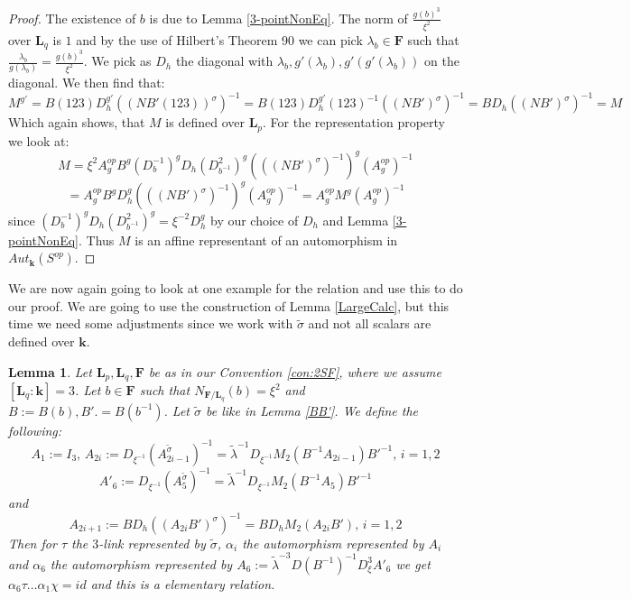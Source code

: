 \documentclass[12pt, oneside, reqno]{amsart}
\newtheorem{lemma}[theorem]{Lemma}
\begin{document}
\begin{proof}
    The existence of $b$ is due to Lemma \ref{3-pointNonEq}. The norm of $\frac{g(b)^3}{\xi^2}$ over $\textbf{L}_q$ is $1$ and by the use of Hilbert's Theorem 90 we can pick $\lambda_b \in \textbf{F}$ such that $\frac{\lambda_b}{g(\lambda_b)} = \frac{g(b)^3}{\xi^2}$. We pick as $D_h$ the diagonal with $\lambda_b, g'(\lambda_b),g'(g'(\lambda_b))$ on the diagonal. We then find that:
    \[M^{g'} = B (123) D_h^{g'} ((N B' (123))^{\sigma})^{-1} = B (123) D_h^{g'} (123)^{-1} ((NB')^{\sigma})^{-1} = B D_h ((NB')^{\sigma})^{-1} = M\]
    Which again shows, that $M$ is defined over $\textbf{L}_p$. For the representation property we look at:
    \[M = \xi^2 A_g^{op} B^g (D_b^{-1})^g D_h (D_{b^{-1}}^2)^g (((NB')^{\sigma})^{-1})^g (A_g^{op})^{-1} \] \[= A_g^{op} B^g D_h^g (((NB')^{\sigma})^{-1})^g (A_g^{op})^{-1} = A_g^{op} M^g (A_g^{op})^{-1}\]
    since $(D_b^{-1})^g D_h (D_{b^{-1}}^2)^g = \xi^{-2}D_h^g$ by our choice of $D_h$ and Lemma \ref{3-pointNonEq}. Thus $M$ is an affine representant of an automorphism in $Aut_{\textbf{k}}(S^{op})$.
\end{proof}
\noindent We are now again going to look at one example for the relation and use this to do our proof. We are going to use the construction of Lemma \ref{LargeCalc}, but this time we need some adjustments since we work with $\tilde \sigma$ and not all scalars are defined over $\textbf{k}$.
\begin{lemma} \label{HardRel}
    Let $\textbf{L}_p, \textbf{L}_q,\textbf{F}$ be as in our Convention \ref{con:2SF}, where we assume $[\textbf{L}_q: \textbf{k}] = 3$. Let $b \in \textbf{F}$ such that $N_{\textbf{F}/\textbf{L}_q}(b) = \xi^2$ and $B:= B(b), B'.= B(b^{-1})$. Let $\tilde \sigma$ be like in Lemma \ref{BB'}. We define the following:
    \[A_1 := I_3, \, A_{2i} := D_{\xi^{-1}} (A_{2i-1}^{\tilde \sigma})^{-1} = \tilde \lambda^{-1} D_{\xi^{-1}} M_2(B^{-1} A_{2i - 1})B'^{-1}, \, i = 1,2\] \[ A'_{6} := D_{\xi^{-1}} (A_{5}^{\tilde \sigma})^{-1} = \tilde \lambda^{-1} D_{\xi^{-1}} M_2(B^{-1} A_{5})B'^{-1}\] and \[A_{2i + 1} := B D_h ((A_{2i}B')^{\sigma})^{-1} = B D_h M_2(A_{2i}B'), \, i=1,2\]
    Then for $\tau$ the $3$-link represented by $\tilde \sigma$, $\alpha_i$ the automorphism represented by $A_i$ and $\alpha_6$ the automorphism represented by $A_6 := \tilde \lambda^{-3}D(B^{-1})^{-1}D_{\xi}^3 A'_6$ we get $\alpha_6 \tau \dots \alpha_1 \chi = id$ and this is a elementary relation. 
\end{lemma}
\end{document}
